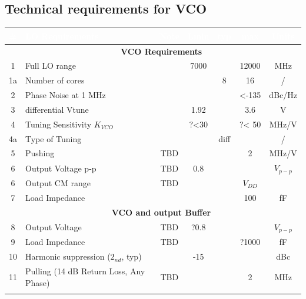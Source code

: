 \newpage

\subsection{Technical requirements for VCO}

\begin{table}[ht]
	\centering
	\begin{tabular}{|c|l|c|c|c|c|c|}
		\hline
		\rowcolor{DarkCyan}
		\textbf{\textcolor{white}{\#}} & \textbf{\textcolor{white}{LO Requirements}}  & \textbf{\textcolor{white}{Note}} &\textbf{\textcolor{white}{Lmin}}  & \textbf{\textcolor{white}{typ}} & \textbf{\textcolor{white}{max}} & \textbf{\textcolor{white}{Units}}  \\
		\hline
		\rowcolor{LightCyan}
		& \multicolumn{6}{c|}{\textbf{VCO Requirements}} \\
		\hline
		1 & Full LO range &  & 7000  &  & 12000 & MHz \\ 
		\hline
		1a & Number of cores &  &   & 8 & 16 & / \\ 
		\hline
		2 & Phase Noise at 1 MHz &  &  &  & <-135 & dBc/Hz \\ 
		\hline
		3 & differential Vtune &  & 1.92 &  & 3.6 & V  \\ %
		\hline
		4 & Tuning Sensitivity $K_{VCO}$ &  & ?<30 &  & ?< 50 & MHz/V  \\ %
		\hline
		4a & Type of Tuning  &  &  & diff  &  & /  \\ 
		\hline
		5 & Pushing & TBD &  &  & 2 & MHz/V  \\ 
		\hline
		6 & Output Voltage p-p & TBD & 0.8 &  & & $V_{p-p}$  \\  %
		\hline
		6 & Output CM range & TBD &  &  & $V_{DD}$ &   \\  %
		\hline
		7 & Load Impedance &  &  &  & 100 & fF  \\ 
		\hline
		\rowcolor{LightCyan}
		& \multicolumn{6}{c|}{\textbf{VCO and output Buffer}} \\
		\hline
		8 & Output Voltage & TBD & ?0.8  &  &  & $V_{p-p}$ \\ 
		\hline
		9 & Load Impedance & TBD &  &  & ?1000 & fF  \\ 
		\hline
		10 & Harmonic suppression ($2_{nd}$, typ) &  & -15 &  &  & dBc  \\ 
		\hline
		11 & Pulling (14 dB Return Loss, Any Phase) & TBD &  &  & 2 & MHz  \\ 
		\hline
		\rowcolor{LightCyan}

\end{tabular}
\end{table}
